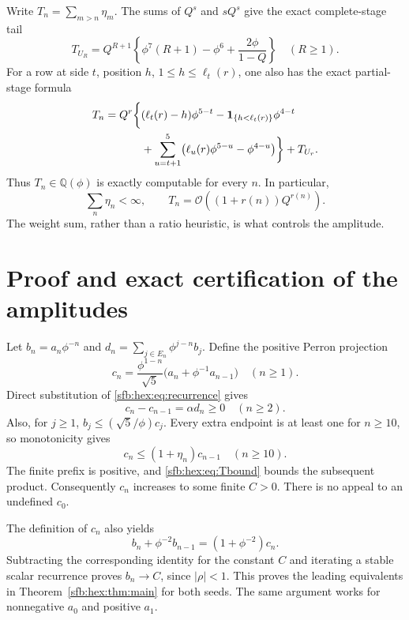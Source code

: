 \documentclass[11pt]{article}
\theoremstyle{remark}\newtheorem{remark}[theorem]{Remark}
\newcommand{\OO}{\mathcal O}
\newcommand{\one}{\boldsymbol 1}
\newcommand{\Q}{\mathbb Q}
\begin{document}
Write $T_n=\sum_{m>n}\eta_m$. The sums of $Q^s$ and $sQ^s$ give the exact complete-stage tail
\begin{equation}\label{sfb:hex:eq:Tstage}
 T_{U_R}=Q^{R+1}\left\{\phi^7(R+1)-\phi^6+\frac{2\phi}{1-Q}\right\}
 \quad(R\ge1).
\end{equation}
For a row at side $t$, position $h$, $1\le h\le\ell_t(r)$, one also has the exact partial-stage formula
\begin{align}
 T_n=Q^r\biggl\{& (\ell_t(r)-h)\phi^{5-t}
       -\one_{\{h<\ell_t(r)\}}\phi^{4-t}\notag\\
       &+\sum_{u=t+1}^5\bigl(\ell_u(r)\phi^{5-u}-\phi^{4-u}\bigr)\biggr\}
       +T_{U_r}.\label{sfb:hex:eq:Tpartial}
\end{align}
Thus $T_n\in\Q(\phi)$ is exactly computable for every $n$. In particular,
\begin{equation}\label{sfb:hex:eq:Tbound}
 \sum_n\eta_n<\infty,\qquad T_n=\OO((1+r(n))Q^{r(n)}).
\end{equation}
The weight sum, rather than a ratio heuristic, is what controls the amplitude.

\section{Proof and exact certification of the amplitudes}\label{sfb:hex:sec:amplitudes}
Let $b_n=a_n\phi^{-n}$ and $d_n=\sum_{j\in E_n}\phi^{j-n}b_j$. Define the positive Perron projection
\begin{equation}\label{sfb:hex:eq:c}
 c_n=\frac{\phi^{1-n}}{\sqrt5}
       \bigl(a_n+\phi^{-1}a_{n-1}\bigr)\quad(n\ge1).
\end{equation}
Direct substitution of \eqref{sfb:hex:eq:recurrence} gives
\begin{equation}\label{sfb:hex:eq:cincrement}
 c_n-c_{n-1}=\alpha d_n\ge0\quad(n\ge2).
\end{equation}
Also, for $j\ge1$, $b_j\le(\sqrt5/\phi)c_j$. Every extra endpoint is at least one for $n\ge10$, so monotonicity gives
\begin{equation}\label{sfb:hex:eq:cproduct}
 c_n\le(1+\eta_n)c_{n-1}\quad(n\ge10).
\end{equation}
The finite prefix is positive, and \eqref{sfb:hex:eq:Tbound} bounds the subsequent product. Consequently $c_n$ increases to some finite $C>0$. There is no appeal to an undefined $c_0$.

The definition of $c_n$ also yields
\begin{equation}\label{sfb:hex:eq:stable}
 b_n+\phi^{-2}b_{n-1}=(1+\phi^{-2})c_n.
\end{equation}
Subtracting the corresponding identity for the constant $C$ and iterating a stable scalar recurrence proves $b_n\to C$, since $|\rho|<1$. This proves the leading equivalents in Theorem~\ref{sfb:hex:thm:main} for both seeds. The same argument works for nonnegative $a_0$ and positive $a_1$.
\end{document}

